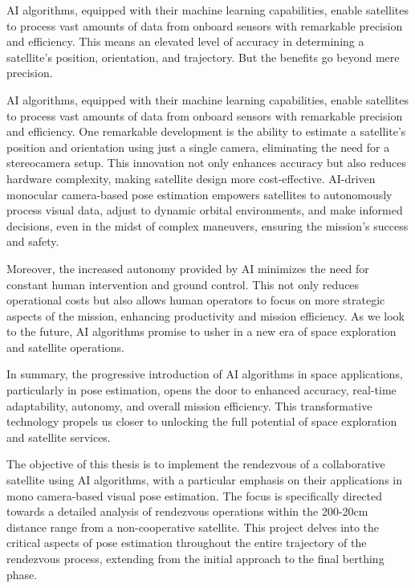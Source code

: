 AI algorithms, equipped with their machine learning capabilities, enable satellites to process vast amounts of data from onboard sensors with remarkable precision and efficiency. This means an elevated level of accuracy in determining a satellite's position, orientation, and trajectory. But the benefits go beyond mere precision.

AI algorithms, equipped with their machine learning capabilities, enable satellites to process vast amounts of data from onboard sensors with remarkable precision and efficiency. One remarkable development is the ability to estimate a satellite's position and orientation using just a single camera, eliminating the need for a stereocamera setup. This innovation not only enhances accuracy but also reduces hardware complexity, making satellite design more cost-effective. AI-driven monocular camera-based pose estimation empowers satellites to autonomously process visual data, adjust to dynamic orbital environments, and make informed decisions, even in the midst of complex maneuvers, ensuring the mission's success and safety.

Moreover, the increased autonomy provided by AI minimizes the need for constant human intervention and ground control. This not only reduces operational costs but also allows human operators to focus on more strategic aspects of the mission, enhancing productivity and mission efficiency. As we look to the future, AI algorithms promise to usher in a new era of space exploration and satellite operations.

In summary, the progressive introduction of AI algorithms in space applications, particularly in pose estimation, opens the door to enhanced accuracy, real-time adaptability, autonomy, and overall mission efficiency. This transformative technology propels us closer to unlocking the full potential of space exploration and satellite services.

The objective of this thesis is to implement the rendezvous of a collaborative satellite using AI algorithms, with a particular emphasis on their applications in mono camera-based visual pose estimation. The focus is specifically directed towards a detailed analysis of rendezvous operations within the 200-20cm distance range from a non-cooperative satellite. This project delves into the critical aspects of pose estimation throughout the entire trajectory of the rendezvous process, extending from the initial approach to the final berthing phase.


